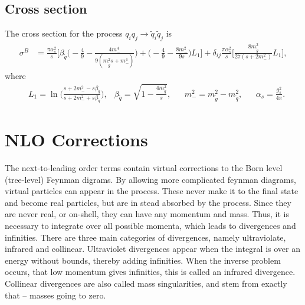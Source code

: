 \documentclass[twoside,english]{uiofysmaster}
\begin{document}
\subsection*{Cross section}

The cross section for the process $q_iq_j \rightarrow \tilde{q}_i \tilde{q}_j$ is \cite{beenakker1997squark}
\begin{align*}
\sigma^B &= \frac{\pi \alpha_s^2}{s} \Bigg[\beta_{\tilde{q}} \Big(-\frac{4}{9} - \frac{4m_-^4}{9(m_{\tilde{g}}^2s+m_-^4)} \Big) + \Big(-\frac{4}{9}- \frac{8m_-^2}{9s} \Big) L_1 \Bigg]
+ \delta_{ij} \frac{\pi \alpha_s^2}{s} \Bigg[ \frac{8m_{\tilde{g}}^2}{27(s+2m_-^2)} L_1 \Bigg],
\end{align*}
where
\begin{align*}
&L_1 = \ln \Big( \frac{s+2m_-^2-s \beta_{\tilde{q}}}{s+ 2m_-^2+s \beta_{\tilde{q}}} \Big), &\beta_{\tilde{q}} = \sqrt{1-\frac{4m_{\tilde{q}}^2}{s}}, &&m_-^2 = m_{\tilde{g}}^2 - m_{\tilde{q}}^2, &&\alpha_s = \frac{g_s^2}{4 \pi}.
\end{align*}

\section{NLO Corrections}

The next-to-leading order terms contain virtual corrections to the Born level (tree-level) Feynman digrams. By allowing more complicated feynman diagrams, virtual particles can appear in the process. These never make it to the final state and become real particles, but are in stead absorbed by the process. Since they are never real, or on-shell, they can have any momentum and mass. Thus, it is necessary to integrate over all possible momenta, which leads to divergences and infinities. There are three main categories of divergences, namely ultraviolate, infrared and collinear. Ultraviolet divergences appear when the integral is over an energy without bounds, thereby adding infinities. When the inverse problem occurs, that low momentum gives infinities, this is called an infrared divergence. Collinear divergences are also called mass singularities, and stem from exactly that -- masses going to zero.
\end{document}
